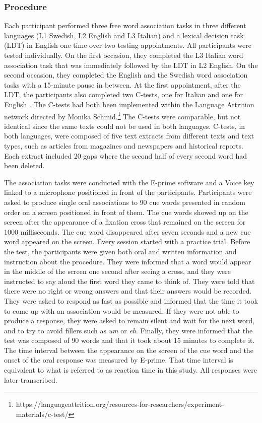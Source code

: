 \documentclass[output=paper,colorlinks,citecolor=brown,nonflat]{langsci/langscibook}
\begin{document}
\subsubsection{Procedure}\label{sec:gudmundson:2.2.1}

Each participant performed three free word association tasks in three different languages (L1 Swedish, L2 English and L3 Italian) and a lexical decision task (LDT) in English one time over two testing appointments. All participants were tested individually. On the first occasion, they completed the L3 Italian word association task that was immediately followed by the LDT in L2 English. On the second occasion, they completed the English and the Swedish word association tasks with a 15-minute pause in between. At the first appointment, after the LDT, the participants also completed two C-tests, one for Italian \citep{Kras2007} and one for English \citep{Keijzer2007}. The C-tests had both been implemented within the Language Attrition network directed by Monika Schmid.\footnote{\textrm{https://languageattrition.org/resources-for-researchers/experiment-materials/c-test/}} The C-tests were comparable, but not identical since the same texts could not be used in both languages. C-tests, in both languages, were composed of five text extracts from different texts and text types, such as articles from magazines and newspapers and historical reports. Each extract included 20 gaps where the second half of every second word had been deleted.

The association tasks were conducted with the E-prime software and a Voice key linked to a microphone positioned in front of the participants. Participants were asked to produce single oral associations to 90 cue words presented in random order on a screen positioned in front of them. The cue words showed up on the screen after the appearance of a fixation cross that remained on the screen for 1000 milliseconds. The cue word disappeared after seven seconds and a new cue word appeared on the screen. Every session started with a practice trial. Before the test, the participants were given both oral and written information and instruction about the procedure. They were informed that a word would appear in the middle of the screen one second after seeing a cross, and they were instructed to say aloud the first word they came to think of. They were told that there were no right or wrong answers and that their answers would be recorded. They were asked to respond as fast as possible and informed that the time it took to come up with an association would be measured. If they were not able to produce a response, they were asked to remain silent and wait for the next word, and to try to avoid fillers such as \textit{um} or \textit{eh}. Finally, they were informed that the test was composed of 90 words and that it took about 15 minutes to complete it. The time interval between the appearance on the screen of the cue word and the onset of the oral response was measured by E-prime. That time interval is equivalent to what is referred to as reaction time in this study. All responses were later transcribed.
\end{document}
